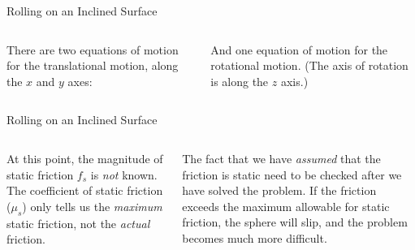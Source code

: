 \documentclass[12pt,compress,aspectratio=169]{beamer}
\begin{document}
\begin{frame}{Rolling on an Inclined Surface}
  \begin{columns}
    

    There are two equations of motion for the translational motion, along the
    $x$ and $y$ axes:
  

    And one equation of motion for the rotational motion. (The axis of
    rotation is along the $z$ axis.)

    
  \end{columns}
\end{frame}



\begin{frame}{Rolling on an Inclined Surface}
  \begin{columns}
    

    At this point, the magnitude of static friction $f_s$ is \emph{not} known.
    The coefficient of static friction ($\mu_s$) only tells us the
    \emph{maximum} static friction, not the \emph{actual} friction.

    \vspace{.1in}The fact that we have \emph{assumed} that the friction is
    static need to be checked after we have solved the problem. If the friction
    exceeds the  maximum allowable for static friction, the sphere will slip,
    and the problem becomes much more difficult.
  \end{columns}
\end{frame}
\end{document}
